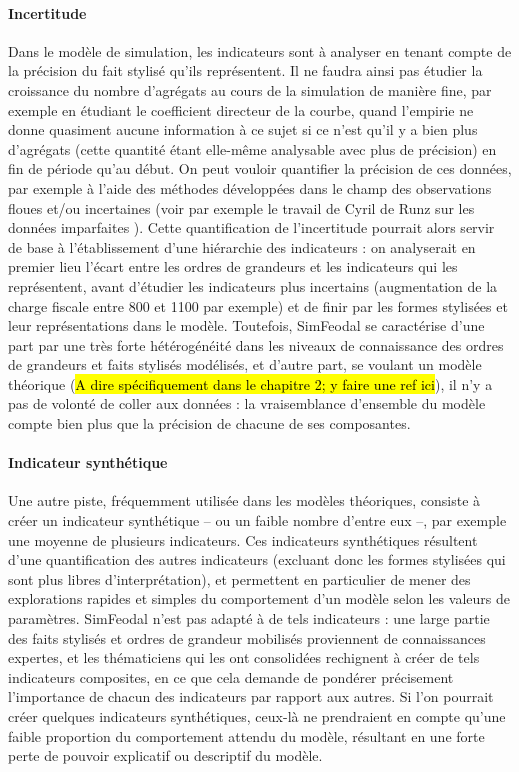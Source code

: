 \documentclass[12pt, a4paper, oneside]{book}
\begin{document}
	\paragraph{Incertitude}
	Dans le modèle de simulation, les indicateurs sont à analyser en tenant compte de la précision du fait stylisé qu'ils représentent. Il ne faudra ainsi pas étudier la croissance  du nombre d'agrégats au cours de la simulation de manière fine, par exemple en étudiant le coefficient directeur de la courbe, quand l'empirie ne donne quasiment aucune information à ce sujet si ce n'est qu'il y a bien plus d'agrégats (cette quantité étant elle-même analysable avec plus de précision) en fin de période qu'au début.
	On peut vouloir quantifier la précision de ces données, par exemple à l'aide des méthodes développées dans le champ des observations floues et/ou incertaines (voir par exemple le travail de Cyril de Runz sur les données \og imparfaites\fg{} \autocite{de2008imperfection}).
	Cette quantification de l'incertitude pourrait alors servir de base à l'établissement d'une hiérarchie des indicateurs : on analyserait en premier lieu l'écart entre les ordres de grandeurs et les indicateurs qui les représentent, avant d'étudier les indicateurs plus incertains (augmentation de la charge fiscale entre 800 et 1100 par exemple) et de finir par les formes stylisées et leur représentations dans le modèle.
	Toutefois, SimFeodal se caractérise d'une part par une très forte hétérogénéité dans les niveaux de connaissance des ordres de grandeurs et faits stylisés modélisés, et d'autre part, se voulant un modèle théorique (\hl{A dire spécifiquement dans le chapitre 2; y faire une ref ici}), il n'y a pas de volonté de \og coller aux données\fg{} : la vraisemblance d'ensemble du modèle compte bien plus que la précision de chacune de ses composantes.
	
	\paragraph{Indicateur synthétique}
	Une autre piste, fréquemment utilisée dans les modèles théoriques, consiste à créer un indicateur synthétique -- ou un faible nombre d'entre eux --,  par exemple une moyenne de plusieurs indicateurs.
	Ces indicateurs synthétiques résultent d'une quantification des autres indicateurs (excluant donc les formes stylisées qui sont plus libres d'interprétation), et permettent en particulier de mener des explorations rapides et simples du comportement d'un modèle selon les valeurs de paramètres.
	SimFeodal n'est pas adapté à de tels indicateurs : une large partie des faits stylisés et ordres de grandeur mobilisés proviennent de connaissances expertes, et les thématiciens qui les ont consolidées rechignent à créer de tels indicateurs composites, en ce que cela demande de pondérer précisement l'importance de chacun des indicateurs par rapport aux autres. Si l'on pourrait créer quelques indicateurs synthétiques, ceux-là ne prendraient en compte qu'une faible proportion du comportement attendu du modèle, résultant en une forte perte de pouvoir explicatif ou descriptif du modèle.
	
\end{document}
